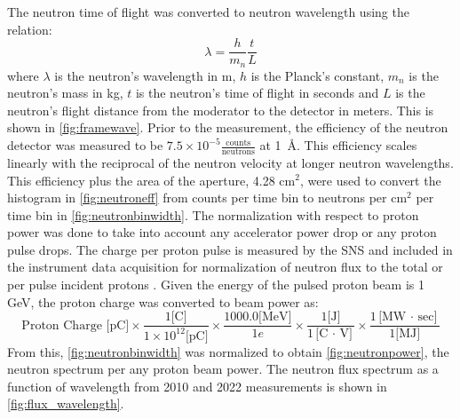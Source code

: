 The neutron time of flight was converted to neutron wavelength using the relation:
\begin{equation}
    \lambda = \frac{h}{m_n}\frac{t}{L}
\end{equation}
where $\lambda$ is the neutron's wavelength in m, $h$ is the Planck's constant, $m_n$ is the neutron's mass in kg, $t$ is the neutron's time of flight in seconds and $L$ is the neutron's flight distance from the moderator to the detector in meters. This is shown in \cref{fig:framewave}. Prior to the measurement, the efficiency of the neutron detector was measured to be $7.5\times10^{-5} \frac{\text{counts}}{\text{neutrons}}$ at 1~\AA. This efficiency scales linearly with the reciprocal of the neutron velocity at longer neutron wavelengths. This efficiency plus the area of the aperture, 4.28 cm$^2$, were used to convert the histogram in  \cref{fig:neutroneff} from counts per time bin to neutrons per cm$^2$ per time bin in \cref{fig:neutronbinwidth}. The normalization with respect to proton power was done to take into account any accelerator power drop or any proton pulse drops. The charge per proton pulse is measured by the SNS and included in the instrument data acquisition for normalization of neutron flux to the total or per pulse incident protons \cite{Blokland2006}. Given the energy of the pulsed proton beam is 1 GeV, the proton charge was converted to beam power as:
\begin{equation}
    \text{Proton Charge [pC]} \times \frac{1\text{[C]}}{1\times10^{12} \text{[pC]}} \times  \frac{1000.0 \text{[MeV]}}{1 e} \times \frac{1 \text{[J]}}{1 \text{[C $\cdot$ V]}} \times \frac{1 \text{[MW $\cdot$ sec]}}{1 \text{[MJ]}} 
\end{equation}
From this, \cref{fig:neutronbinwidth} was normalized to obtain \cref{fig:neutronpower}, the neutron spectrum per any proton beam power. The neutron flux spectrum as a function of wavelength from 2010 and 2022 measurements is shown in \cref{fig:flux_wavelength}.

